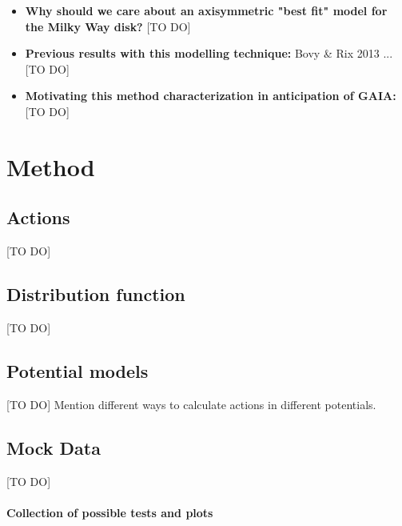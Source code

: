 \documentclass[12pt,preprint]{aastex}
\begin{document}
\begin{itemize}
[TO DO] (Maybe cite Potzen 2015, who showed that analysing aspherical systems in spherical actions can still be a powerful tool, when used with care...)

\item \textbf{Why should we care about an axisymmetric "best fit" model for the Milky Way disk?} [TO DO]

\item \textbf{Previous results with this modelling technique:} Bovy \& Rix 2013 ... [TO DO]

\item \textbf{Motivating this method characterization in anticipation of GAIA:} [TO DO]
\end{itemize}

\section{Method}

\subsection{Actions}

[TO DO]


\subsection{Distribution function}

[TO DO]

\subsection{Potential models}

[TO DO] Mention different ways to calculate actions in different potentials.

\subsection{Mock Data}

[TO DO]

\paragraph{Collection of possible tests and plots}
\end{document}
